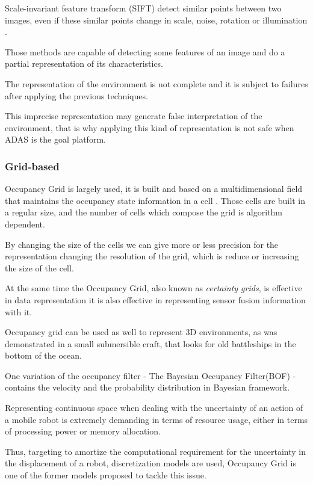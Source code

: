 Scale-invariant feature transform (SIFT) detect similar points between two images, even if these similar points change in scale, noise, rotation or illumination \cite{Lowe:1999:ORL:850924.851523}.

Those methods are capable of detecting some features of an image and do a partial representation of its characteristics. 

The representation of the environment is not complete and it is subject to failures after applying the previous techniques.

This imprecise representation may generate false interpretation of the environment, that is why applying this kind of representation is not safe when ADAS is the goal platform.

\subsubsection{Grid-based}
\label{ch02:gridbased}

Occupancy Grid is largely used, it is built and based on a multidimensional field that maintains the occupancy state information in a cell \cite{Elfes:1989:UOG:68491.68495}. Those cells are built in a regular size, and the number of cells which compose the grid is algorithm dependent.

By changing the size of the cells we can give more or less precision for the representation changing the resolution of the grid, which is reduce or increasing the size of the cell.

At the same time the Occupancy Grid, also known as \textit{certainty grids}, is effective in data representation it is also effective in representing sensor fusion information with it. 

Occupancy grid can be used as well to represent 3D environments, as was demonstrated in a small submersible craft, that looks for old battleships in the bottom of the ocean\cite{DBLP:journals/aim/Moravec88}.

One variation of the occupancy filter - The Bayesian Occupancy Filter(BOF) - contains the velocity and the probability distribution in Bayesian framework.

Representing continuous space when dealing with the uncertainty of an action of a mobile robot is extremely demanding in terms of resource usage, either in terms of processing power or memory allocation.

Thus, targeting to amortize the computational requirement for the uncertainty in the displacement of a robot, discretization models are used, Occupancy Grid\cite{Elfes:1989:UOG:68491.68495} is one of the former models proposed to tackle this issue.

